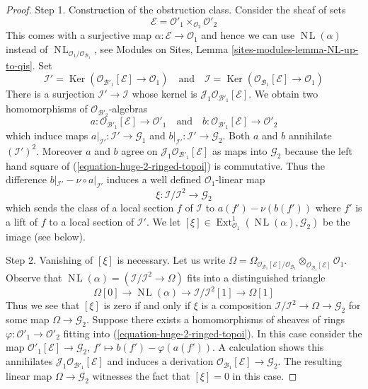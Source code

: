 \documentclass[10pt,a4paper]{amsart}
\theoremstyle{plain}
\theoremstyle{definition}
\theoremstyle{remark}
\numberwithin{equation}{subsection}
\def\Ext{\mathop{\mathrm{Ext}}\nolimits}
\def\NL{\mathop{N\!L}\nolimits}
\def\Ker{\mathop{\mathrm{Ker}}}
\begin{document}
\begin{proof}
\medskip\noindent
Step 1. Construction of the obstruction class. Consider the sheaf
of sets
$$
\mathcal{E} = \mathcal{O}'_1 \times_{\mathcal{O}_2} \mathcal{O}'_2
$$
This comes with a surjective map $\alpha : \mathcal{E} \to \mathcal{O}_1$
and hence we can use $\NL(\alpha)$ instead of
$\NL_{\mathcal{O}_1/\mathcal{O}_{\mathcal{B}_1}}$, see
Modules on Sites, Lemma \ref{sites-modules-lemma-NL-up-to-qis}.
Set
$$
\mathcal{I}' =
\Ker(\mathcal{O}_{\mathcal{B}'_1}[\mathcal{E}] \to \mathcal{O}_1)
\quad\text{and}\quad
\mathcal{I} =
\Ker(\mathcal{O}_{\mathcal{B}_1}[\mathcal{E}] \to \mathcal{O}_1)
$$
There is a surjection $\mathcal{I}' \to \mathcal{I}$ whose kernel
is $\mathcal{J}_1\mathcal{O}_{\mathcal{B}'_1}[\mathcal{E}]$.
We obtain two homomorphisms of $\mathcal{O}_{\mathcal{B}'_2}$-algebras
$$
a : \mathcal{O}_{\mathcal{B}'_1}[\mathcal{E}] \to \mathcal{O}'_1
\quad\text{and}\quad
b : \mathcal{O}_{\mathcal{B}'_1}[\mathcal{E}] \to \mathcal{O}'_2
$$
which induce maps $a|_{\mathcal{I}'} : \mathcal{I}' \to \mathcal{G}_1$ and
$b|_{\mathcal{I}'} : \mathcal{I}' \to \mathcal{G}_2$. Both $a$ and $b$
annihilate $(\mathcal{I}')^2$. Moreover $a$ and $b$ agree on
$\mathcal{J}_1\mathcal{O}_{\mathcal{B}'_1}[\mathcal{E}]$
as maps into $\mathcal{G}_2$
because the left hand square of (\ref{equation-huge-2-ringed-topoi})
is commutative. Thus the difference
$b|_{\mathcal{I}'} - \nu \circ a|_{\mathcal{I}'}$
induces a well defined $\mathcal{O}_1$-linear map
$$
\xi : \mathcal{I}/\mathcal{I}^2 \longrightarrow \mathcal{G}_2
$$
which sends the class of a local section $f$ of $\mathcal{I}$ to
$a(f') - \nu(b(f'))$ where $f'$ is a lift of $f$ to a local
section of $\mathcal{I}'$. We let
$[\xi] \in \Ext^1_{\mathcal{O}_1}(\NL(\alpha), \mathcal{G}_2)$
be the image (see below).

\medskip\noindent
Step 2. Vanishing of $[\xi]$ is necessary. Let us write $\Omega =
\Omega_{\mathcal{O}_{\mathcal{B}_1}[\mathcal{E}]/\mathcal{O}_{\mathcal{B}_1}}
\otimes_{\mathcal{O}_{\mathcal{B}_1}[\mathcal{E}]} \mathcal{O}_1$.
Observe that $\NL(\alpha) = (\mathcal{I}/\mathcal{I}^2 \to \Omega)$
fits into a distinguished triangle
$$
\Omega[0] \to
\NL(\alpha) \to
\mathcal{I}/\mathcal{I}^2[1] \to
\Omega[1]
$$
Thus we see that $[\xi]$ is zero if and only if $\xi$
is a composition $\mathcal{I}/\mathcal{I}^2 \to \Omega \to \mathcal{G}_2$
for some map $\Omega \to \mathcal{G}_2$. Suppose there exists a
homomorphisms of sheaves of rings
$\varphi : \mathcal{O}'_1 \to \mathcal{O}'_2$ fitting into
(\ref{equation-huge-2-ringed-topoi}). In this case consider the map
$\mathcal{O}'_1[\mathcal{E}] \to \mathcal{G}_2$,
$f' \mapsto b(f') - \varphi(a(f'))$. A calculation
shows this annihilates $\mathcal{J}_1\mathcal{O}_{\mathcal{B}'_1}[\mathcal{E}]$
and induces a derivation
$\mathcal{O}_{\mathcal{B}_1}[\mathcal{E}] \to \mathcal{G}_2$.
The resulting linear map $\Omega \to \mathcal{G}_2$ witnesses the
fact that $[\xi] = 0$ in this case.


\end{proof}
\end{document}
